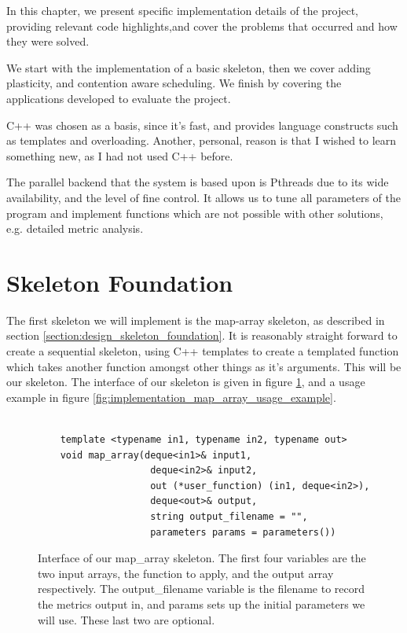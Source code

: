 
In this chapter, we present specific implementation details of the project, providing relevant code highlights,and cover the problems that occurred and how they were solved.

We start with the implementation of a basic skeleton, then we cover adding plasticity, and contention aware scheduling. We finish by covering the applications developed to evaluate the project.

C++ was chosen as a basis, since it's fast, and provides language constructs such as templates and overloading. Another, personal, reason is that I wished to learn something new, as I had not used C++ before. 

The parallel backend that the system is based upon is Pthreads due to its wide availability, and the level of fine control. It allows us to tune all parameters of the program and implement functions which are not possible with other solutions, e.g. detailed metric analysis. 



\section{Skeleton Foundation}
\label{section:implementation_skeleton_foundation}

The first skeleton we will implement is the map-array skeleton, as described in section \ref{section:design_skeleton_foundation}. It is reasonably straight forward to create a sequential skeleton, using C++ templates to create a templated function which takes another function amongst other things as it's arguments. This will be our skeleton. The interface of our skeleton is given in figure \ref{fig:implementation_map_array_interface}, and a usage example in figure \ref{fig:implementation_map_array_usage_example}.



\begin{figure}
	\begin{lstlisting}

	template <typename in1, typename in2, typename out>
	void map_array(deque<in1>& input1, 
				   	deque<in2>& input2, 
				   	out (*user_function) (in1, deque<in2>), 
				   	deque<out>& output, 
				   	string output_filename = "", 
				   	parameters params = parameters())

	\end{lstlisting}

	\caption{Interface of our map\_array skeleton. The first four variables are the two input arrays, the function to apply, and the output array respectively. The output\_filename variable is the filename to record the metrics output in, and params sets up the initial parameters we will use. These last two are optional.}
	\label{fig:implementation_map_array_interface}
\end{figure}




